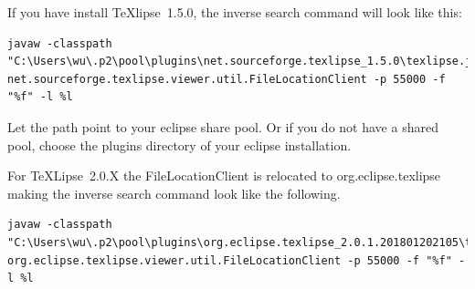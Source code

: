 \begin{otherlanguage}{english}
If you have install TeXlipse~1.5.0, the inverse search command will look like this:

\begin{lstlisting}[breaklines=true, basicstyle=\ttfamily, columns=flexible]
javaw -classpath "C:\Users\wu\.p2\pool\plugins\net.sourceforge.texlipse_1.5.0\texlipse.jar" net.sourceforge.texlipse.viewer.util.FileLocationClient -p 55000 -f "%f" -l %l
\end{lstlisting}

Let the path point to your eclipse share pool. Or if you do not have a shared pool, choose the plugins directory of your eclipse installation.

For TeXLipse~2.0.X the FileLocationClient is relocated to org.eclipse.texlipse making the inverse search command look like the following.
\begin{lstlisting}[breaklines=true, basicstyle=\ttfamily, columns=flexible]
javaw -classpath "C:\Users\wu\.p2\pool\plugins\org.eclipse.texlipse_2.0.1.201801202105\texlipse.jar" org.eclipse.texlipse.viewer.util.FileLocationClient -p 55000 -f "%f" -l %l
\end{lstlisting}

\end{otherlanguage}